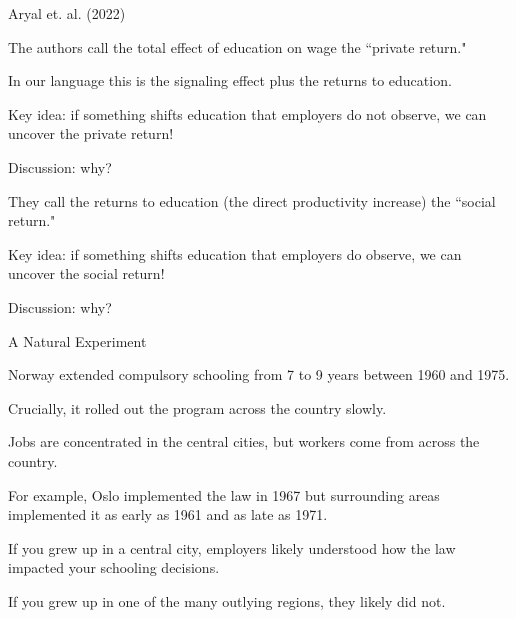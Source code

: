 \documentclass[aspectratio=169,usenames,dvipsnames]{beamer}
\newenvironment{wideitemize}{\itemize\addtolength{\itemsep}{10pt}}{\enditemize}
\begin{document}
\begin{frame}{Aryal et. al. (2022)}
    \begin{wideitemize}
        \item The authors call the total effect of education on wage the ``private return."
        \item In our language this is the signaling effect plus the returns to education.
        \begin{wideitemize}
            \item Key idea: if something shifts education that employers do not observe, we can uncover the private return!
            \item Discussion: why?
        \end{wideitemize}
        \item They call the returns to education (the direct productivity increase) the ``social return."
         \begin{wideitemize}
            \item Key idea: if something shifts education that employers do observe, we can uncover the social return!
            \item Discussion: why?
        \end{wideitemize}
    \end{wideitemize}
\end{frame}
\begin{frame}{A Natural Experiment}
    \begin{wideitemize}
       \item Norway extended compulsory schooling from 7 to 9 years between 1960 and 1975.
       \item Crucially, it rolled out the program across the country slowly.
       \item Jobs are concentrated in the central cities, but workers come from across the country.
       \item For example, Oslo implemented the law in 1967 but surrounding areas implemented it as early as 1961 and as late as 1971.
       \item If you grew up in a central city, employers likely understood how the law impacted your schooling decisions.
       \item If you grew up in one of the many outlying regions, they likely did not.
    \end{wideitemize}
\end{frame}
\end{document}
